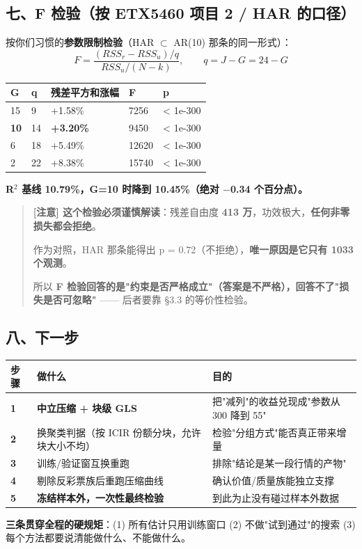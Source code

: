 \documentclass[11pt]{article}
\begin{document}
\subsection{\texorpdfstring{七、F 检验（按 ETX5460 项目 2 / HAR 的口径）}{七、F 检验（按 ETX5460 项目 2 / HAR 的口径）}}
按你们习惯的\textbf{参数限制检验}（HAR \ensuremath{\subset} AR(10) 那条的同一形式）：
\[
F=\frac{(RSS_r-RSS_u)/q}{RSS_u/(N-k)},\qquad q=J-G=24-G
\]
{\small
\begin{longtable}{p{2.56cm}p{2.13cm}p{5.97cm}p{2.13cm}p{3.41cm}}
\toprule
G & q & 残差平方和涨幅 & F & p \\
\midrule
15 & 9 & +1.58\% & 7256 & < 1e-300 \\
\textbf{10} & 14 & \textbf{+3.20\%} & 9450 & < 1e-300 \\
6 & 18 & +5.49\% & 12620 & < 1e-300 \\
2 & 22 & +8.38\% & 15740 & < 1e-300 \\
\bottomrule
\end{longtable}
}
\textbf{R\ensuremath{^2} 基线 10.79\%，G=10 时降到 10.45\%（绝对 \ensuremath{-}0.34 个百分点）。}
\begin{quote}
\textbf{\textbf{[注意]} 这个检验必须谨慎解读}：残差自由度 \textbf{413 万}，功效极大，\textbf{任何非零损失都会拒绝}。

作为对照，HAR 那条能得出 p = 0.72（不拒绝），\textbf{唯一原因是它只有 1033 个观测}。

所以 \textbf{F 检验回答的是"约束是否严格成立"（答案是不严格），回答不了"损失是否可忽略"} ------ 后者要靠 \S{}3.3 的等价性检验。
\end{quote}
\subsection{\texorpdfstring{八、下一步}{八、下一步}}
{\small
\begin{longtable}{p{1.27cm}p{7.99cm}p{6.95cm}}
\toprule
步骤 & 做什么 & 目的 \\
\midrule
\textbf{1} & \textbf{中立压缩 + 块级 GLS} & 把"减列"的收益兑现成"参数从 300 降到 55" \\
\textbf{2} & 换聚类判据（按 ICIR 份额分块，允许块大小不均） & 检验"分组方式"能否真正带来增量 \\
\textbf{3} & 训练/验证窗互换重跑 & 排除"结论是某一段行情的产物" \\
\textbf{4} & 剔除反彩票族后重跑压缩曲线 & 确认价值/质量族能独立支撑 \\
\textbf{5} & \textbf{冻结样本外，一次性最终检验} & 到此为止没有碰过样本外数据 \\
\bottomrule
\end{longtable}
}
\textbf{三条贯穿全程的硬规矩}：(1) 所有估计只用训练窗口 (2) 不做"试到通过"的搜索 (3) 每个方法都要说清能做什么、不能做什么。
\end{document}
